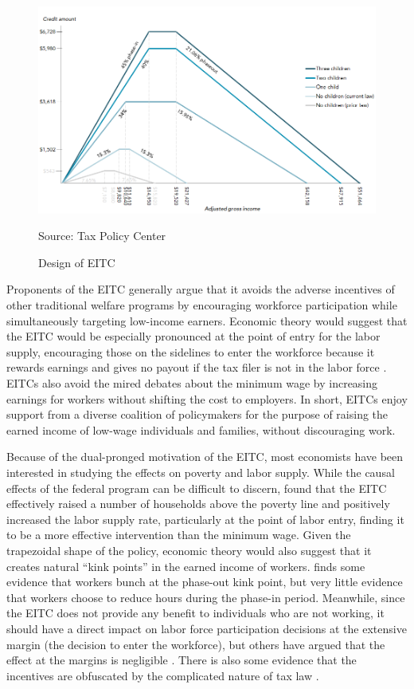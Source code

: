\documentclass{article}
\begin{document}
 \begin{figure}[H]
    \caption{Design of EITC}
    \begin{center}
        \includegraphics[width=.85\textwidth]{eitc_design}
    \end{center}
	\footnotesize
    \label{fig:tax}{Source: Tax Policy Center}
\end{figure}

Proponents of the EITC generally argue that it avoids the adverse incentives of other traditional welfare programs by encouraging workforce participation while simultaneously targeting low-income earners. Economic theory would suggest that the EITC would be especially pronounced at the point of entry for the labor supply, encouraging those on the sidelines to enter the workforce because it rewards earnings and gives no payout if the tax filer is not in the labor force \citep{eissa2006behavioral}. EITCs also avoid the mired debates about the minimum wage by increasing earnings for workers without shifting the cost to employers. In short, EITCs enjoy support from a diverse coalition of policymakers for the purpose of raising the earned income of low-wage individuals and families, without discouraging work.

Because of the dual-pronged motivation of the EITC, most economists have been interested in studying the effects on poverty and labor supply. While the causal effects of the federal program can be difficult to discern, \cite{neumark2001using} found that the EITC effectively raised a number of households above the poverty line and positively increased the labor supply rate, particularly at the point of labor entry, finding it to be a more effective intervention than the minimum wage. Given the trapezoidal shape of the policy, economic theory would also suggest that it creates natural “kink points” in the earned income of workers.  \cite{saez2010taxpayers} finds some evidence that workers bunch at the phase-out kink point, but very little evidence that workers choose to reduce hours during the phase-in period. Meanwhile, since the EITC does not provide any benefit to individuals who are not working, it should have a direct impact on labor force participation decisions at the extensive margin (the decision to enter the workforce), but others have argued that the effect at the margins is negligible \citep{kleven2019eitc}. There is also some evidence that the incentives are obfuscated by the complicated nature of tax law \citep{chetty2013teaching}.
\end{document}
